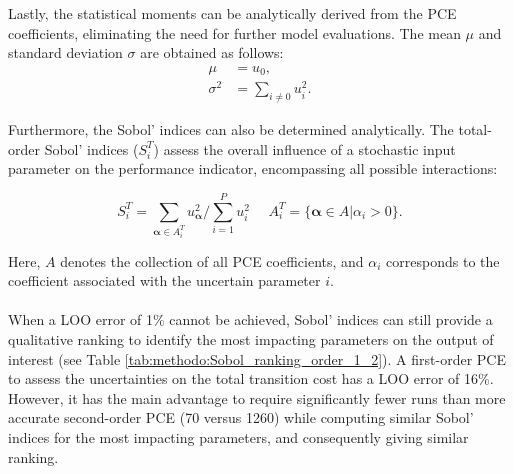 Lastly, the statistical moments can be analytically derived from the PCE coefficients, eliminating the need for further model evaluations. The mean $\mu$ and standard deviation $\sigma$ are obtained as follows:
\begin{align}
\mu &= u_0,\\
\sigma^2 &= \sum_{i \neq 0 } u_{i}^2 .
\label{eq:pce:statmom}
\end{align}

Furthermore, the Sobol' indices can also be determined analytically. The total-order Sobol' indices ($S_i^{T}$) assess the overall influence of a stochastic input parameter on the performance indicator, encompassing all possible interactions:

\begin{equation}
S_i^{T} = \sum_{\bm{\alpha} \in A_i^T}^{} u_{\bm{\alpha}}^2/\sum_{i=1}^P u_i^2 ~~~~~~ A_i^T = \{\bm{\alpha} \in A | \alpha_i > 0\}.
\end{equation}

Here, $A$ denotes the collection of all PCE coefficients, and $\alpha_i$ corresponds to the coefficient associated with the uncertain parameter $i$.\\

\\

When a \gls{LOO} error of 1\% cannot be achieved, Sobol' indices can still provide a qualitative ranking to identify the most impacting parameters on the output of interest (see Table \ref{tab:methodo:Sobol_ranking_order_1_2}). A first-order \gls{PCE} to assess the uncertainties on the total transition cost has a \gls{LOO} error of 16\%. However, it has the main advantage to require significantly fewer runs than more accurate second-order \gls{PCE} (70 versus 1260) while computing similar Sobol' indices for the most impacting parameters, and consequently giving similar ranking.


